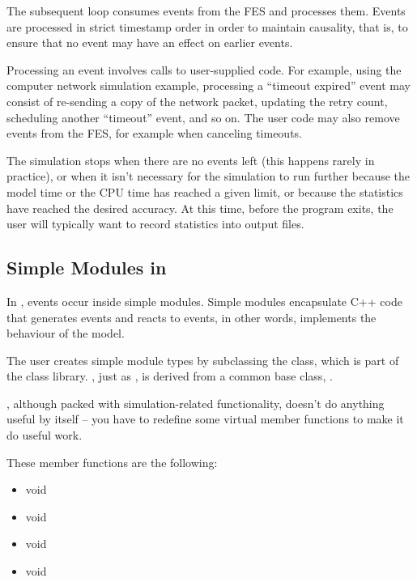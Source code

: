 The subsequent loop consumes events from the FES and processes
them. Events are processed in strict timestamp order in order
to maintain causality, that is, to ensure that no event may have
an effect on earlier events.

Processing an event involves calls to user-supplied code. For example,
using the computer network simulation example, processing a ``timeout
expired'' event may consist of re-sending a copy of the network
packet, updating the retry count, scheduling another ``timeout''
event, and so on. The user code may also remove events from the FES,
for example when canceling timeouts.

The simulation stops when there are no events left (this happens
rarely in practice), or when it isn't necessary for the simulation
to run further because the model time or the CPU time has reached
a given limit, or because the statistics have reached the desired
accuracy. At this time, before the program exits, the user
will typically want to record statistics into output files.



\subsection{Simple Modules in {\opp}}
\label{sec:simple-modules-in-opp}

In {\opp}, events occur inside simple modules.
Simple modules encapsulate C++ code that generates events and reacts to events,
in other words, implements the behaviour of the model.

The user creates simple module types by subclassing the 
class, which is part of the {\opp} class library.
, just as , is derived
from a common base class, .

, although packed with simulation-related
functionality, doesn't do anything useful by itself -- you have
to redefine some virtual member functions to make it do useful work.


These member functions are the following:
\begin{itemize}
  \item{void }
  \item{void }
  \item{void }
  \item{void }
\end{itemize}

